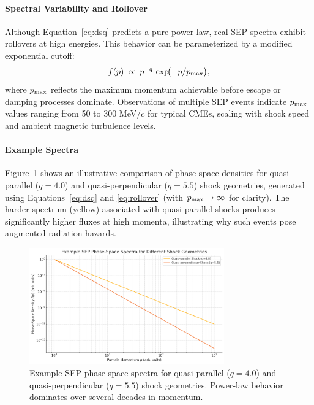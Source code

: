 \documentclass[12pt]{report}
\begin{document}
\paragraph{Spectral Variability and Rollover}  
Although Equation~\eqref{eq:dsq} predicts a pure power law, real SEP spectra exhibit rollovers at high energies.  This behavior can be parameterized by a modified exponential cutoff:
\begin{equation}
  f(p) \;\propto\; p^{-q}\,\exp\!\bigl(-p/p_{\rm max}\bigr),
  \label{eq:rollover}
\end{equation}
where $p_{\rm max}$ reflects the maximum momentum achievable before escape or damping processes dominate.  Observations of multiple SEP events indicate $p_{\rm max}$ values ranging from 50 to 300 MeV/$c$ for typical CMEs, scaling with shock speed and ambient magnetic turbulence levels.

\paragraph{Example Spectra}  
Figure~\ref{fig:sep_spectra} shows an illustrative comparison of phase-space densities for quasi-parallel ($q=4.0$) and quasi-perpendicular ($q=5.5$) shock geometries, generated using Equations~\eqref{eq:dsq} and \eqref{eq:rollover} (with $p_{\rm max}\rightarrow\infty$ for clarity).  The harder spectrum (yellow) associated with quasi-parallel shocks produces significantly higher fluxes at high momenta, illustrating why such events pose augmented radiation hazards.

\begin{figure}[ht]
  \centering
  \includegraphics[width=0.75\textwidth]{sep_spectra_plot.png}
  \caption{Example SEP phase‐space spectra for quasi-parallel ($q=4.0$) and 
           quasi-perpendicular ($q=5.5$) shock geometries.  Power‐law behavior 
           dominates over several decades in momentum.}
  \label{fig:sep_spectra}
\end{figure}
\end{document}
